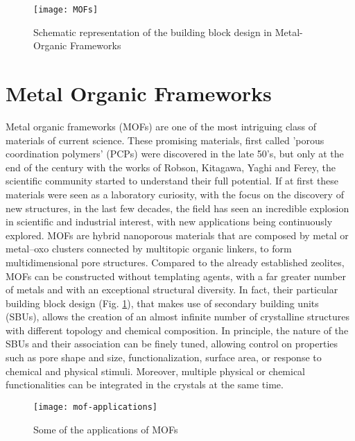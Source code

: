 \begin{figure}[!htbp]
	\centering
 	\texttt{[image: MOFs]}
	\caption{Schematic representation of the building block design in Metal-Organic Frameworks}
	\label{fig:MOFs}
\end{figure}

\section{Metal Organic Frameworks}
Metal organic frameworks (MOFs) are one of the most intriguing class of materials of current science. These promising materials, first called 'porous coordination polymers' (PCPs) were discovered in the late 50's, but only at the end of the century with the works of Robson\cite{batten1995two,hoskins1990design}, Kitagawa\cite{kitagawa1991synthesis, kitagawa1993synthesis}, Yaghi\cite{yaghi1995hydrothermal} and Ferey\cite{riou1998hybrid}, the scientific community started to understand their full potential. If at first these materials were seen as a laboratory curiosity, with the focus on the discovery of new structures, in the last few decades, the field has seen an incredible explosion in scientific and industrial interest, with new applications being continuously explored\cite{furukawa2013chemistry}. MOFs are hybrid nanoporous materials that are composed by metal or metal--oxo clusters connected by multitopic organic linkers, to form multidimensional pore structures. Compared to the already established zeolites, MOFs can be constructed without templating agents, with a far greater number of metals and with an exceptional structural diversity. In fact, their particular building block design (Fig. \ref{fig:MOFs}), that makes use of secondary building units (SBUs), allows the creation of an almost infinite number of crystalline structures with different topology and chemical composition. In principle, the nature of the SBUs and their association can be finely tuned\cite{stock2011synthesis}, allowing control on properties such as pore shape and size, functionalization, surface area, or response to chemical and physical stimuli\cite{zhou2014metal,zhou2012introduction}. Moreover, multiple physical or chemical functionalities can be integrated in the crystals at the same time\cite{li2016applications}. 
%
%
\begin{figure}[htbp]
	\centering
 	\texttt{[image: mof-applications]}
	\caption{Some of the applications of MOFs}
	\label{fig:mof-applications}
\end{figure}
